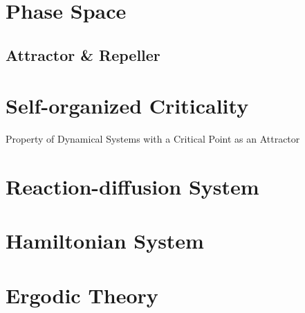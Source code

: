 \endgroup



\section{Phase Space}\label{sec:phase_space}

\subsection{Attractor \& Repeller}\label{sec:attractor_repeller}



\section{Self-organized Criticality}\label{sec:self_organized_criticality}

Property of Dynamical Systems with a Critical Point as an Attractor




\section{Reaction-diffusion System}\label{sec:reaction_diffusion}

\section{Hamiltonian System}\label{sec:hamiltonian_system}

\section{Ergodic Theory}\label{sec:ergodic_theory}

